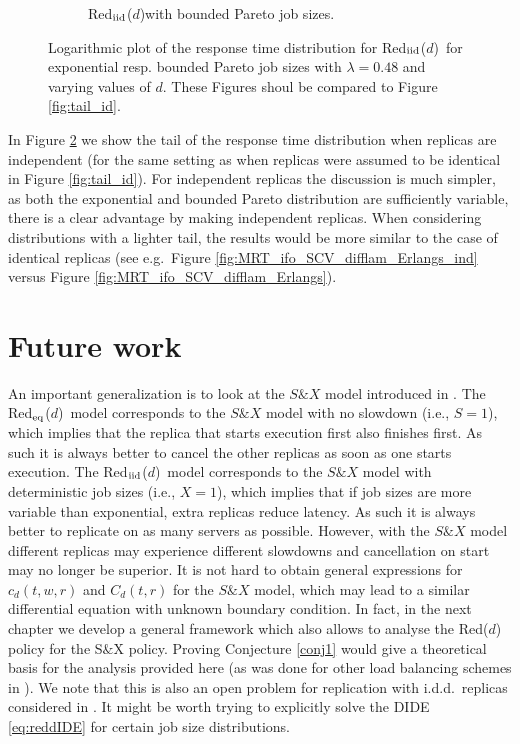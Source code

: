 \documentclass[12pt]{report}
\newcommand{\Redid}{Red$_{\textup{eq}}$($d$)}
\newcommand{\Redind}{Red$_{\textup{iid}}$($d$)}
\begin{document}
\begin{figure}[t]
\begin{subfigure}{.45\textwidth}
\begin{center}
\caption{\Redind with bounded Pareto job sizes.}
\label{fig:tail_BPindvard}
\end{center}
\end{subfigure}
\caption{Logarithmic plot of the response time distribution for \Redind\ for exponential resp. bounded Pareto job sizes with $\lambda = 0.48$ and varying values of $d$. These Figures shoul be compared to Figure \ref{fig:tail_id}.}
\label{fig:tail_ind}
\end{figure}
In Figure \ref{fig:tail_ind} we show the tail of the response time distribution when replicas are independent (for the same setting as when replicas were assumed to be identical in Figure \ref{fig:tail_id}). For independent replicas the discussion is much simpler, as both the exponential and bounded Pareto distribution are sufficiently variable, there is a clear advantage by making independent replicas. When considering distributions with a lighter tail, the results would be more similar to the case of identical replicas (see e.g.~Figure \ref{fig:MRT_ifo_SCV_difflam_Erlangs_ind} versus Figure \ref{fig:MRT_ifo_SCV_difflam_Erlangs}).

\section{Future work}\label{sec:future}
An important generalization is to look at the $S\&X$ model introduced in \cite{gardner2017better}. The \Redid\ model corresponds to the $S\&X$ model with no slowdown (i.e., $S=1$), which implies that the replica that starts execution first also finishes first. As such it is always better to cancel the other replicas
as soon as one starts execution. The \Redind\ model corresponds to the $S\&X$ model with deterministic job sizes (i.e., $X=1$), which implies that if job sizes are more variable than exponential, extra replicas reduce latency. As such it is always better to replicate on as many servers as possible.
However, with the $S\&X$ model different replicas may experience different slowdowns and cancellation on start may no longer
be superior. It is not hard to obtain general expressions for $c_d(t,w,r)$ and $C_d(t,r)$ for the $S\&X$ model, which may lead to a similar differential equation with unknown boundary condition. In fact, in the next chapter we develop a general framework which also allows to analyse the Red($d$) policy for the S$\&$X policy.
Proving Conjecture \ref{conj1} would give a theoretical basis for the analysis provided here (as was done for other load balancing schemes in \cite{bramson2012asymptotic}). We note that this is also an open problem for replication with i.d.d.~replicas considered in \cite{gardnerOR}. 
It might be worth trying to explicitly solve the DIDE \eqref{eq:reddIDE} for certain job size distributions.
\end{document}
